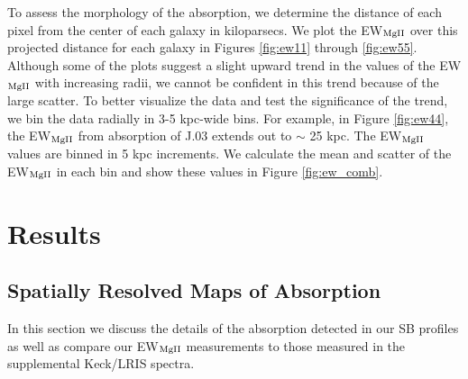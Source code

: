 \documentclass[twocolumn]{aastex61}
\begin{document}
To assess the morphology of the  absorption, we determine the distance of each pixel from the center of each galaxy in kiloparsecs. We plot the EW$_{\rm{MgII}}$ over this projected distance for each galaxy in Figures \ref{fig:ew11} through \ref{fig:ew55}. Although some of the plots suggest a slight upward trend in the values of the EW$_{\rm{MgII}}$ with increasing radii, we cannot be confident in this trend because of the large scatter. To better visualize the data and test the significance of the trend, we bin the data radially in 3-5 kpc-wide bins. For example, in Figure \ref{fig:ew44}, the EW$_{\rm{MgII}}$ from absorption of J.03 extends out to $\sim$ 25 kpc. The EW$_{\rm{MgII}}$ values are binned in 5 kpc increments. We calculate the mean and scatter of the EW$_{\rm{MgII}}$ in each bin and show these values in Figure \ref{fig:ew_comb}.   

\section{Results}\label{sec:results}

\subsection{Spatially Resolved Maps of  Absorption}
In this section we discuss the details of the absorption detected in our SB profiles as well as compare our EW$_{\rm{MgII}}$ measurements to those measured in the supplemental Keck/LRIS spectra. 
\end{document}
